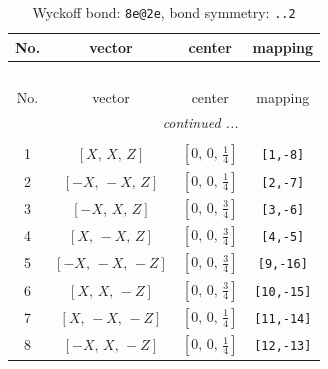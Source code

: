 \documentclass[fleqn,8pt]{jsarticle}
\begin{document}
\begin{longtable}{cccc}
\caption{Wyckoff bond: {\tt 8e@2e}, bond symmetry: {\tt ..2}}
 \\
 \hline \hline
No. & vector & center & mapping \\ \hline \endfirsthead

\multicolumn{3}{l}{\tablename\ \thetable{}} \\
 \hline \hline
No. & vector & center & mapping \\ \hline \endhead

 \hline \hline
\multicolumn{3}{r}{\footnotesize\it continued ...} \\ \endfoot

 \hline \hline
\multicolumn{3}{r}{} \\ \endlastfoot

1 & $\left[ X,\, X,\, Z \right]$ & $\left[ 0,\, 0,\, \frac{1}{4} \right]$ & {\tt [1,-8]} \\ \hline
2 & $\left[ - X,\, - X,\, Z \right]$ & $\left[ 0,\, 0,\, \frac{1}{4} \right]$ & {\tt [2,-7]} \\ \hline
3 & $\left[ - X,\, X,\, Z \right]$ & $\left[ 0,\, 0,\, \frac{3}{4} \right]$ & {\tt [3,-6]} \\ \hline
4 & $\left[ X,\, - X,\, Z \right]$ & $\left[ 0,\, 0,\, \frac{3}{4} \right]$ & {\tt [4,-5]} \\ \hline
5 & $\left[ - X,\, - X,\, - Z \right]$ & $\left[ 0,\, 0,\, \frac{3}{4} \right]$ & {\tt [9,-16]} \\ \hline
6 & $\left[ X,\, X,\, - Z \right]$ & $\left[ 0,\, 0,\, \frac{3}{4} \right]$ & {\tt [10,-15]} \\ \hline
7 & $\left[ X,\, - X,\, - Z \right]$ & $\left[ 0,\, 0,\, \frac{1}{4} \right]$ & {\tt [11,-14]} \\ \hline
8 & $\left[ - X,\, X,\, - Z \right]$ & $\left[ 0,\, 0,\, \frac{1}{4} \right]$ & {\tt [12,-13]} \\
\end{longtable}
\renewcommand{\arraystretch}{1.2}
\end{document}
